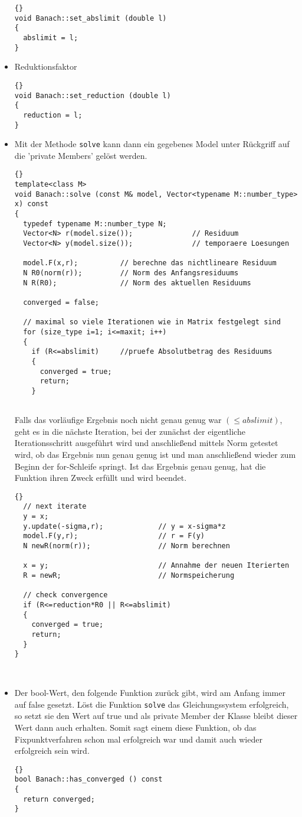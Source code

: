 \documentclass[a4paper,11pt]{article}
\theoremstyle{definition}
\begin{document}
\begin{itemize}
{{\begin{lstlisting}{}
void Banach::set_abslimit (double l)
{
  abslimit = l;
}
\end{lstlisting}}}  
\item Reduktionsfaktor
{\footnotesize{\begin{lstlisting}{}
void Banach::set_reduction (double l)
{
  reduction = l;
}
\end{lstlisting}}}
\item Mit der Methode \lstinline{solve} kann dann ein gegebenes Model unter Rückgriff auf die 'private Members' gelöst werden.
{\footnotesize{\begin{lstlisting}{}
template<class M>
void Banach::solve (const M& model, Vector<typename M::number_type> x) const
{
  typedef typename M::number_type N;      
  Vector<N> r(model.size());              // Residuum
  Vector<N> y(model.size());              // temporaere Loesungen

  model.F(x,r);          // berechne das nichtlineare Residuum
  N R0(norm(r));         // Norm des Anfangsresiduums
  N R(R0);               // Norm des aktuellen Residuums

  converged = false;
      
  // maximal so viele Iterationen wie in Matrix festgelegt sind
  for (size_type i=1; i<=maxit; i++) 
  { 
    if (R<=abslimit)     //pruefe Absolutbetrag des Residuums
    {
      converged = true;
      return;
    } 
      
 \end{lstlisting}}}
Falls das vorläufige Ergebnis noch nicht genau genug war $(\leqslant abslimit)$, geht es in die nächste Iteration, bei der zunächst der eigentliche Iterationsschritt ausgeführt wird und anschließend mittels Norm getestet wird, ob das Ergebnis nun genau genug ist und man anschließend wieder zum Beginn der for-Schleife springt. Ist das Ergebnis genau genug, hat die Funktion ihren Zweck erfüllt und wird beendet.
{\footnotesize{\begin{lstlisting}{}
  // next iterate
  y = x;                                    
  y.update(-sigma,r);             // y = x-sigma*z
  model.F(y,r);                   // r = F(y)
  N newR(norm(r));                // Norm berechnen
    
  x = y;                          // Annahme der neuen Iterierten
  R = newR;                       // Normspeicherung

  // check convergence
  if (R<=reduction*R0 || R<=abslimit)
  {
    converged = true;
    return;
  }
}

    
\end{lstlisting}}}
\item Der bool-Wert, den folgende Funktion zurück gibt, wird am Anfang immer auf false gesetzt. Löst die Funktion \lstinline{solve} das Gleichungssystem erfolgreich, so setzt sie den Wert auf true und als private Member der Klasse bleibt dieser Wert dann auch erhalten. Somit sagt einem diese Funktion, ob das Fixpunktverfahren schon mal erfolgreich war und damit auch wieder erfolgreich sein wird.
{\footnotesize{\begin{lstlisting}{}
bool Banach::has_converged () const
{
  return converged;
}


\end{lstlisting}}}
\end{itemize}
\end{document}
